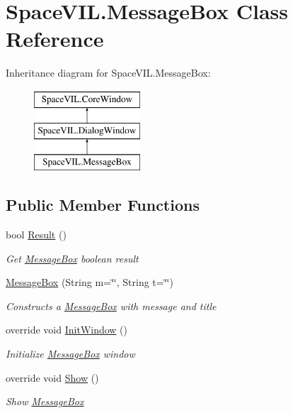 \hypertarget{class_space_v_i_l_1_1_message_box}{}\section{Space\+V\+I\+L.\+Message\+Box Class Reference}
\label{class_space_v_i_l_1_1_message_box}
Inheritance diagram for Space\+V\+I\+L.\+Message\+Box\+:\begin{figure}[H]
\begin{center}
\leavevmode
\includegraphics[height=3.000000cm]{class_space_v_i_l_1_1_message_box}
\end{center}
\end{figure}
\subsection*{Public Member Functions}
\begin{DoxyCompactItemize}
\item 
bool \mbox{\hyperlink{class_space_v_i_l_1_1_message_box_a9f0785f2987c4aa2aa1efb2c7323e3c2}{Result}} ()
\begin{DoxyCompactList}\small\item\em Get \mbox{\hyperlink{class_space_v_i_l_1_1_message_box}{Message\+Box}} boolean result \end{DoxyCompactList}\item 
\mbox{\hyperlink{class_space_v_i_l_1_1_message_box_a127851c5ef0b92c55134c37820b5e459}{Message\+Box}} (String m=\char`\"{}\char`\"{}, String t=\char`\"{}\char`\"{})
\begin{DoxyCompactList}\small\item\em Constructs a \mbox{\hyperlink{class_space_v_i_l_1_1_message_box}{Message\+Box}} with message and title \end{DoxyCompactList}\item 
override void \mbox{\hyperlink{class_space_v_i_l_1_1_message_box_ac14ecd2643e043c578ef4cf568887daf}{Init\+Window}} ()
\begin{DoxyCompactList}\small\item\em Initialize \mbox{\hyperlink{class_space_v_i_l_1_1_message_box}{Message\+Box}} window \end{DoxyCompactList}\item 
override void \mbox{\hyperlink{class_space_v_i_l_1_1_message_box_a2d2963f79fd8eb73c03872eee52b4331}{Show}} ()
\begin{DoxyCompactList}\small\item\em Show \mbox{\hyperlink{class_space_v_i_l_1_1_message_box}{Message\+Box}} \end{DoxyCompactList}\end{DoxyCompactItemize}
